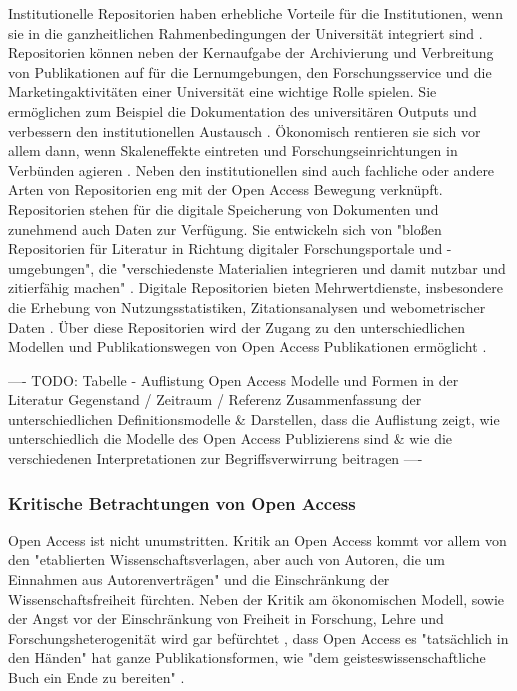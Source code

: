 Institutionelle Repositorien haben erhebliche Vorteile für die Institutionen, wenn sie in die ganzheitlichen Rahmenbedingungen der Universität integriert sind \cite{steele_2006}. Repositorien können neben der Kernaufgabe der Archivierung und Verbreitung von Publikationen auf für die Lernumgebungen, den Forschungsservice und die Marketingaktivitäten einer Universität eine wichtige Rolle spielen. Sie ermöglichen zum Beispiel die Dokumentation des universitären Outputs und verbessern den institutionellen Austausch \cite{steele_2006}. Ökonomisch rentieren sie sich vor allem dann, wenn Skaleneffekte eintreten und Forschungseinrichtungen in Verbünden agieren \cite{blythe_2005value}. Neben den institutionellen sind auch fachliche oder andere Arten von Repositorien eng mit der Open Access Bewegung verknüpft. Repositorien stehen für die digitale Speicherung von Dokumenten und zunehmend auch Daten zur Verfügung. Sie entwickeln sich von "bloßen Repositorien für Literatur in Richtung digitaler Forschungsportale und -umgebungen", die "verschiedenste Materialien integrieren und damit nutzbar und zitierfähig machen" \cite{Schmidt_2009}. Digitale Repositorien bieten Mehrwertdienste, insbesondere die Erhebung von Nutzungsstatistiken, Zitationsanalysen und webometrischer Daten \cite{jahn_2011_personliche} \cite{mayr_2005_webometrie}. Über diese Repositorien wird der Zugang zu den unterschiedlichen Modellen und Publikationswegen von Open Access Publikationen ermöglicht \cite{suber_2015}.

---- TODO: Tabelle - Auflistung Open Access  Modelle und Formen in der Literatur Gegenstand / Zeitraum / Referenz Zusammenfassung der unterschiedlichen Definitionsmodelle & Darstellen, dass die Auflistung zeigt, wie unterschiedlich die Modelle des Open Access Publizierens sind & wie die verschiedenen Interpretationen zur Begriffsverwirrung beitragen ----

\subsubsection{Kritische Betrachtungen von Open Access}

Open Access ist nicht unumstritten. Kritik an Open Access kommt vor allem von den "etablierten Wissenschaftsverlagen, aber auch von Autoren, die um Einnahmen aus Autorenverträgen" \cite{Schirmbacher_oa_2007} und die Einschränkung der Wissenschaftsfreiheit fürchten. Neben der Kritik am ökonomischen Modell, sowie der Angst vor der Einschränkung von Freiheit in Forschung, Lehre und Forschungsheterogenität wird gar befürchtet \cite{Szczesny_2014}, dass Open Access es "tatsächlich in den Händen" hat ganze Publikationsformen, wie "dem geisteswissenschaftliche Buch ein Ende zu bereiten" \cite{Hirschi_2015_buch_oa}.

